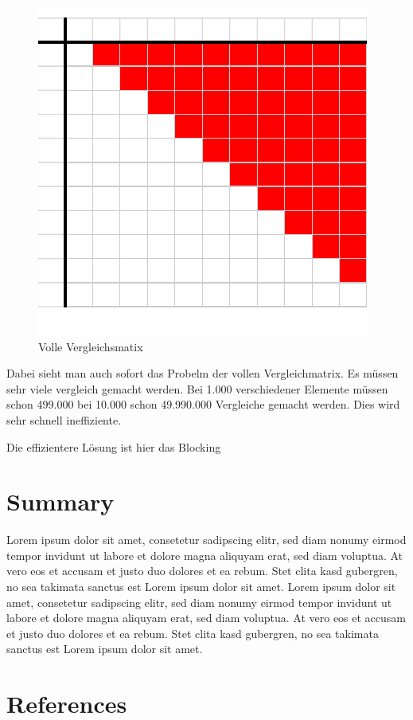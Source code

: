 \documentclass[sigconf]{acmart}
\begin{document}
\begin{figure}[htbp]
  \centering
  \includegraphics{table.pdf}
  \caption{Volle Vergleichsmatix}
  \label{abb:matrix}
\end{figure}

Dabei sieht man auch sofort das Probelm der vollen Vergleichmatrix.
Es müssen sehr viele vergleich gemacht werden. Bei 1.000 verschiedener
Elemente müssen schon 499.000 bei 10.000 schon 49.990.000 Vergleiche 
gemacht werden. Dies wird sehr schnell ineffiziente.

Die effizientere Lösung ist hier das Blocking

\section*{Summary}
Lorem ipsum dolor sit amet, consetetur sadipscing elitr, sed diam nonumy eirmod tempor invidunt ut labore et dolore magna aliquyam erat, sed diam voluptua. At vero eos et accusam et justo duo dolores et ea rebum. Stet clita kasd gubergren, no sea takimata sanctus est Lorem ipsum dolor sit amet. Lorem ipsum dolor sit amet, consetetur sadipscing elitr, sed diam nonumy eirmod tempor invidunt ut labore et dolore magna aliquyam erat, sed diam voluptua. At vero eos et accusam et justo duo dolores et ea rebum. Stet clita kasd gubergren, no sea takimata sanctus est Lorem ipsum dolor sit amet.

\section*{References}
\end{document}
